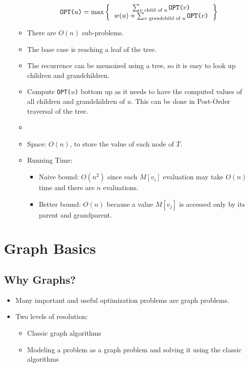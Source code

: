 \begin{itemize}
\begin{itemize}
        \begin{equation}
            \texttt{OPT($u$)} = \max \left\{
                \begin{tabular}{c}
                    $\sum_{\text{$v$ child of $u$}} \texttt{OPT($v$)}$ \\
                    $w(u) + \sum_{\text{$v$ grandchild of $u$}} \texttt{OPT($v$)}$
                \end{tabular}
            \right\}
        \end{equation}
        \item There are $O(n)$ sub-problems.
        \item The base case is reaching a leaf of the tree.
        \item The recurrence can be memoized using a tree, so it is easy to look up children and grandchildren.
        \item Compute \texttt{OPT($u$)} bottom up as it needs to have the computed values of all children and grandchildren of $u$. This can be done in Post-Order traversal of the tree.
        \item[] 
        \item Space: $O(n)$, to store the value of each node of $T$.
        \item Running Time:
        \begin{itemize}
            \item Naive bound: $O(n^2)$ since each $M[v_i]$ evaluation may take $O(n)$ time and there are $n$ evaluations.
            \item Better bound: $O(n)$ because a value $M[v_j]$ is accessed only by its parent and grandparent.
        \end{itemize}
    \end{itemize}
\end{itemize}

\section{Graph Basics}

\subsection{Why Graphs?}
\begin{itemize}
    \item Many important and useful optimization problems are graph problems.
    \item Two levels of resolution:
    \begin{itemize}
        \item Classic graph algorithms
        \item Modeling a problem as a graph problem and solving it using the classic algorithms
    \end{itemize}
\end{itemize}

